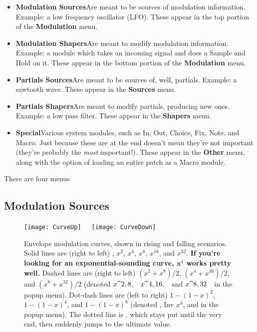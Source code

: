 \documentclass{article}
\begin{document}
\begin{itemize}
\item {\bf Modulation Sources}\quad Are meant to be sources of modulation information.  Example: a low frequency oscillator (LFO).  These appear in the top portion of the {\bf Modulation} menu.
\item {\bf Modulation Shapers}\quad Are meant to modify modulation information.  Example: a module which takes an incoming signal and does a Sample and Hold on it.     These appear in the bottom portion of the {\bf Modulation} menu.
\item {\bf Partials Sources}\quad Are meant to be sources of, well, partials.  Example: a sawtooth wave.    These appear in the {\bf Sources} menu.
\item {\bf Partials Shapers}\quad Are meant to modify partials, producing new ones.  Example: a low pass filter.  These appear in the {\bf Shapers} menu.

\item {\bf Special}\quad Various system modules, such as In, Out, Choice, Fix, Note, and Macro.  Just because these are at the end doesn't mean they're not important (they're probably the {\it most} important!).  These appear in the {\bf Other} menu, along with the option of loading an entire patch as a Macro module.
\end{itemize}

There are four menus 

\subsection{Modulation Sources}
\label{modsources}

\begin{wrapfigure}{r}{3.1in}
\vspace{-1.25em}
\texttt{[image: CurveUp]}~~~\texttt{[image: CurveDown]}
\caption{Envelope modulation curves, shown in rising and falling scenarios.  Solid lines are (right to left) {\color{NavyBlue}{\it Linear}}, {\color{Tan}\(x^2\)}, {\color{LimeGreen}\(x^4\)}, {\color{Red}\(x^8\)}, {\color{Periwinkle}\(x^{16}\)}, and {\color{Mahogany}\(x^{32}\)}.  {\bf If you're looking for an exponential-sounding curve, \(\bm x^4\) works pretty well.}  Dashed lines are (right to left) {\color{YellowOrange}\((x^2 + x^8)/2\)},  {\color{Fuchsia}\((x^4 + x^{16})/2\)}, and  {\color{OliveGreen}\((x^8 + x^{32})/2\)} (denoted {\color{YellowOrange}\(x$\mbox{\textasciicircum}$ 2, 8\)},\ \  {\color{Fuchsia}\(x$\mbox{\textasciicircum}$ 4, 16\)},\ \  and {\color{OliveGreen}\(x$\mbox{\textasciicircum}$ 8, 32\)}\ \  in the popup menu).  Dot-dash lines are (left to right) {\color{Red}\(1-(1-x)^2\)}, {\color{RoyalBlue}\(1-(1-x)^4\)}, and {\color{BurntOrange}\(1-(1-x)^8\)} (denoted {\color{Red}{\it Inv \(x^2\)}, {\color{RoyalBlue}Inv \(x^4\)},} and {\color{BurntOrange}{\it Inv \(x^8\)}} in the popup menu).  The dotted line is {\color{Cerulean}{\it Step}}, which stays put until the very end, then suddenly jumps to the ultimate value. }
\label{curves}
\end{wrapfigure}
\end{document}
